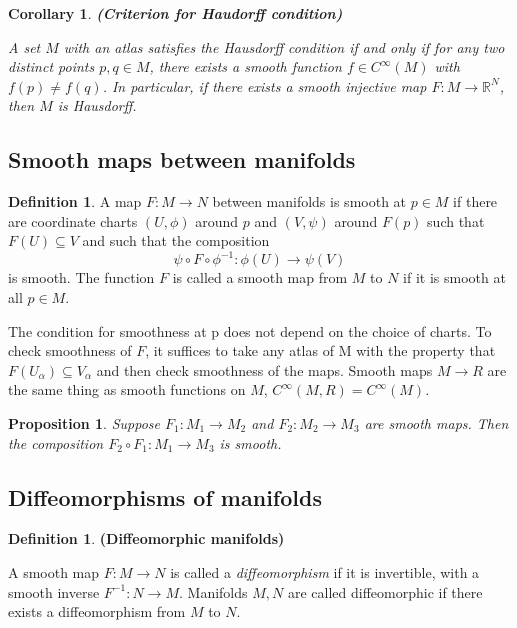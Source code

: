 \documentclass{article}
\newtheorem{corollary}{Corollary}[theorem]
\newtheorem{proposition}{Proposition}[theorem]
\theoremstyle{definition}
\newtheorem{defn}[theorem]{Definition}
\newenvironment{definition}
  {\vspace{8pt}\begin{mdframed}[backgroundcolor=blueish]\begin{defn}}
  {\end{defn}\end{mdframed}\vspace{4pt}}
\begin{document}
\begin{corollary} \textbf{(Criterion for Haudorff condition)}


A set $M$ with an atlas satisfies the Hausdorff condition if and only if for any two distinct points $p,q \in M$, there exists a smooth function $f \in C^\infty(M)$ with $f(p) \neq f(q)$. In particular, if there exists a smooth injective map $F : M \rightarrow \mathbb R^N$, then $M$ is Hausdorff.
\end{corollary}

\subsection{Smooth maps between manifolds}
\begin{definition} 

A map $F : M \rightarrow N$ between manifolds is smooth at $p \in M$ if there are coordinate charts $(U,\phi)$ around $p$ and $(V,\psi)$ around $F(p)$ such that $F(U) \subseteq V$ and such that the composition
\[
    \psi \circ F \circ \phi^{-1}: \phi(U) \rightarrow \psi(V)
\]
is smooth. The function $F$ is called a smooth map from $M$ to $N$ if it is smooth at all $p \in M$.

\end{definition}

The condition for smoothness at p does not depend on the choice
of charts. To check smoothness of $F$, it suffices to take any atlas of M with the property that $F(U_\alpha) \subseteq V_\alpha$ and then check smoothness of the maps. Smooth maps $M \rightarrow R$ are the same thing as smooth functions on $M$, $C^{\infty} (M,R) = C^{\infty}(M)$.

\begin{proposition}
Suppose $F_1 : M_1 \rightarrow M_2$ and $F_2 : M_2 \rightarrow M_3$ are smooth maps. Then the composition $ F_2 \circ F_1 : M_1 \rightarrow M_3$ is smooth.
\end{proposition}

\subsection{Diffeomorphisms of manifolds}

\begin{definition} \textbf{(Diffeomorphic manifolds)}

A smooth map $F : M \rightarrow N$ is called a \textit{diffeomorphism} if it is invertible, with a smooth inverse $F^{-1} : N \rightarrow M$. Manifolds $M,N$ are called diffeomorphic if there exists a diffeomorphism from $M$ to $N$.
\end{definition}
\end{document}
